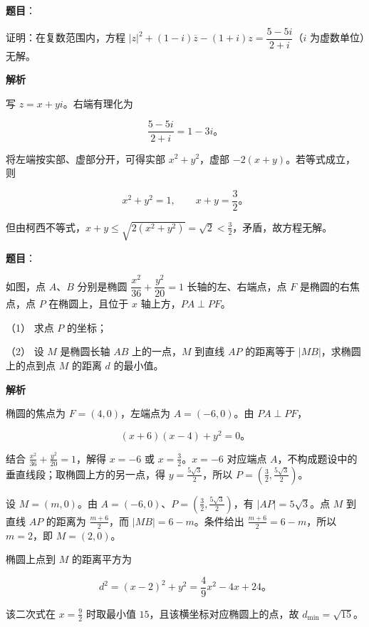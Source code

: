 \begin{answer}

\textbf{题目}：

证明：在复数范围内，方程 $|z|^2+(1-i)\overline z-(1+i)z=\dfrac{5-5i}{2+i}$（$i$ 为虚数单位）无解。

\textbf{解析}

写 $z=x+yi$。右端有理化为

\nopagebreak[4]
\[
\frac{5-5i}{2+i}=1-3i\mbox{。}
\]

将左端按实部、虚部分开，可得实部 $x^2+y^2$，虚部 $-2(x+y)$。若等式成立，则

\nopagebreak[4]
\[
x^2+y^2=1,\qquad x+y=\frac32\mbox{。}
\]

但由柯西不等式，$x+y\le\sqrt{2(x^2+y^2)}=\sqrt2<\frac32$，矛盾，故方程无解。


\end{answer}
\begin{answer}

\textbf{题目}：

如图，点 $A$、$B$ 分别是椭圆 $\dfrac{x^2}{36}+\dfrac{y^2}{20}=1$ 长轴的左、右端点，点 $F$ 是椭圆的右焦点，点 $P$ 在椭圆上，且位于 $x$ 轴上方，$PA\perp PF$。

（1） 求点 $P$ 的坐标；

（2） 设 $M$ 是椭圆长轴 $AB$ 上的一点，$M$ 到直线 $AP$ 的距离等于 $|MB|$，求椭圆上的点到点 $M$ 的距离 $d$ 的最小值。
\nopagebreak[4]
\begin{center}\end{center}
\nopagebreak[4]
\textbf{解析}


椭圆的焦点为 $F=(4,0)$，左端点为 $A=(-6,0)$。由 $PA\perp PF$，

\nopagebreak[4]
\[
(x+6)(x-4)+y^2=0\mbox{。}
\]

结合 $\frac{x^2}{36}+\frac{y^2}{20}=1$，解得 $x=-6$ 或 $x=\frac32$。$x=-6$ 对应端点 $A$，不构成题设中的垂直线段；取椭圆上方的另一点，得 $y=\frac{5\sqrt3}{2}$，所以 $P=(\frac32,\frac{5\sqrt3}{2})$。


设 $M=(m,0)$。由 $A=(-6,0)$、$P=(\frac32,\frac{5\sqrt3}{2})$，有 $|AP|=5\sqrt3$。点 $M$ 到直线 $AP$ 的距离为 $\frac{m+6}{2}$，而 $|MB|=6-m$。条件给出 $\frac{m+6}{2}=6-m$，所以 $m=2$，即 $M=(2,0)$。

椭圆上点到 $M$ 的距离平方为

\nopagebreak[4]
\[
d^2=(x-2)^2+y^2=\frac49x^2-4x+24\mbox{。}
\]

该二次式在 $x=\frac92$ 时取最小值 $15$，且该横坐标对应椭圆上的点，故 $d_{\min}=\sqrt{15}$。



\end{answer}
